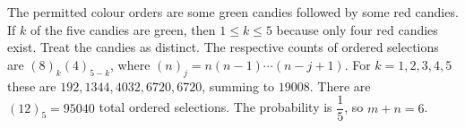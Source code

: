 The permitted colour orders are some green candies followed by some red candies. If $k$ of the five candies are green, then $1\le k\le5$ because only four red candies exist. Treat the candies as distinct. The respective counts of ordered selections are $(8)_k(4)_{5-k}$, where $(n)_j=n(n-1)\cdots(n-j+1)$. For $k=1,2,3,4,5$ these are $192,1344,4032,6720,6720$, summing to $19008$. There are $(12)_5=95040$ total ordered selections. The probability is $\dfrac{1}{5}$, so $m+n=\boxed6$.
